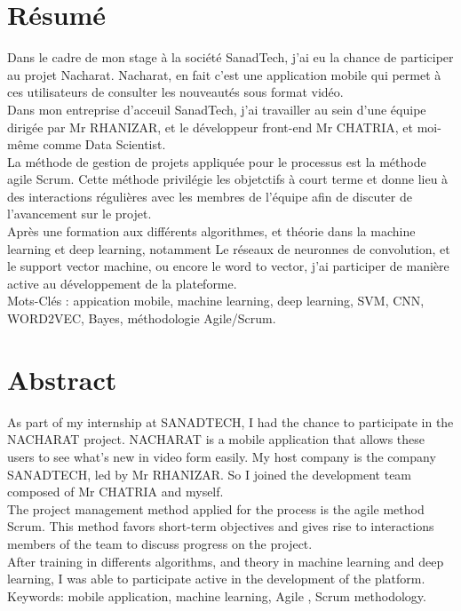 \documentclass[11pt, oneside]{Thesis} %
\begin{document}
\chapter*{Résumé}
Dans le cadre de mon stage à la société SanadTech, j'ai eu la chance de participer au projet Nacharat. Nacharat, en fait c'est une application mobile qui permet à ces utilisateurs de consulter les nouveautés sous format vidéo.\\
Dans mon entreprise d'acceuil SanadTech, j'ai travailler au sein d'une équipe dirigée par Mr RHANIZAR, et le développeur front-end Mr CHATRIA, et moi-même comme Data Scientist.\\
La méthode de gestion de projets appliquée pour le processus est la méthode agile Scrum. Cette méthode privilégie les objetctifs à court terme et donne lieu à des interactions régulières avec les membres de l'équipe afin de discuter de l'avancement sur le projet.\\
Après une formation aux différents algorithmes, et théorie dans la machine learning et deep learning, notamment Le réseaux de neuronnes de convolution, et le support vector machine, ou encore le word to vector, j'ai participer de manière active au développement de la plateforme.\\[1cm]

Mots-Clés : appication mobile, machine learning, deep learning, SVM, CNN, WORD2VEC, Bayes, méthodologie Agile/Scrum.



%

\clearpage %

\clearpage %
\chapter*{Abstract}
As part of my internship at SANADTECH, I had the chance to participate in the NACHARAT project. NACHARAT is a mobile application that allows these users to see what’s new in video form easily. My host company is the company SANADTECH, led by Mr RHANIZAR. So I joined the development team composed of Mr CHATRIA and myself.\\
The project management method applied for the process is the agile method Scrum. This method favors short-term objectives and gives rise to interactions members of the team to discuss progress on the project.\\[0.2cm]
After training in differents algorithms, and theory in machine learning and deep learning, I was able to participate active in the development of the platform.\\[1cm]
Keywords: mobile application, machine learning, Agile , Scrum methodology.
\end{document}
